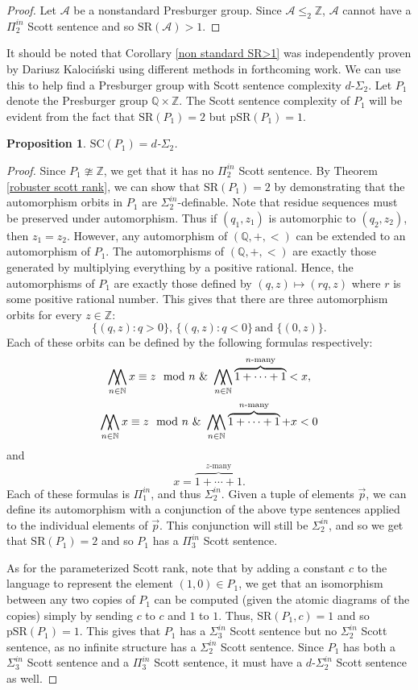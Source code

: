 \documentclass{amsart}%
\numberwithin{theorem}{section}
\newtheorem{proposition}[theorem]{Proposition}
\newcommand{\Q}{\mathbb{Q}}
\newcommand{\Z}{\mathbb{Z}}
\newcommand{\N}{\mathbb{N}}
\newcommand{\A}{\mathcal{A}}
\newcommand{\0}{\emptyset}
\DeclareMathOperator*{\WW}{\bigwedge\mkern-12mu\bigwedge}
\newcommand{\SR}{\text{SR}}
\newcommand{\pSR}{\text{pSR}}
\newcommand{\SC}{\text{SC}}
\begin{document}
\begin{proof}
    Let $\A$ be a nonstandard Presburger group. Since $\A\leq_2\Z$, $\A$ cannot have a $\Pi^{in}_2$ Scott sentence and so $\SR(\A)>1$. 
\end{proof}

It should be noted that Corollary \ref{non standard SR>1} was independently proven by Dariusz Kaloci\'nski using different methods in forthcoming work. We can use this to help find a Presburger group with Scott sentence complexity $d$-$\Sigma_2$. Let $P_1$ denote the Presburger group $\Q\times \Z$. The Scott sentence complexity of $P_1$ will be evident from the fact that $\SR(P_1)=2$ but $\pSR(P_1)=1$. 

\begin{proposition}
\label{P_1 SC}
    $\SC(P_1)=d$-$\Sigma_2$.
\end{proposition}

\begin{proof}
    Since $P_1\ncong\Z$, we get that it has no $\Pi^{in}_2$ Scott sentence. By Theorem \ref{robuster scott rank}, we can show that $\SR(P_1)=2$ by demonstrating that the automorphism orbits in $P_1$ are $\Sigma^{in}_2$-definable. Note that residue sequences must be preserved under automorphism. Thus if $(q_1,z_1)$ is automorphic to $(q_2,z_2)$, then $z_1=z_2$. However, any  automorphism of $(\Q,+,<)$ can be extended to an automorphism of $P_1$. The  automorphisms of $(\Q,+,<)$ are exactly those generated by multiplying everything by a positive rational. Hence, the automorphisms of $P_1$ are exactly those defined by $(q,z)\mapsto (rq,z)$ where $r$ is some positive rational number. This gives that there are three automorphism orbits for every $z \in \Z$: $$\{(q,z):q>0\}, \, \{(q,z):q<0\}\, \text {and } \{(0,z)\}.$$ Each of these orbits can be defined by the following formulas respectively:
    $$\WW_{n\in \N} x \equiv z \mod n \,\, \&\,\, \WW_{n\in \N} \overbrace{1+\cdots + 1}^\text{$n$-many}<x,$$ 
    $$\WW_{n\in \N} x \equiv z \mod n \,\, \&\,\, \WW_{n\in \N} \overbrace{1+\cdots + 1}^\text{$n$-many}+x<0$$ and $$x=\overbrace{1+\cdots + 1}^{z\text{-many}}. $$
    Each of these formulas is $\Pi^{in}_1$, and thus $\Sigma^{in}_2$. Given a tuple of elements $\vec p$, we can define its automorphism with a conjunction of the above type sentences applied to the individual elements of $\vec p$. This conjunction will still be $\Sigma^{in}_2$, and so we get that $\SR(P_1)= 2$ and so $P_1$ has a $\Pi^{in}_3$ Scott sentence. 

    As for the parameterized Scott rank, note that  by adding a constant $c$ to the language to represent the element $(1,0)\in P_1$, we get that an isomorphism between any two copies of $P_1$ can be computed (given the atomic diagrams of the copies) simply by sending $c$ to $c$ and $1$ to $1$. Thus, $\SR(P_1,c)=1$ and so $\pSR(P_1)=1$. This gives that $P_1$ has a $\Sigma^{in}_3$ Scott sentence but no $\Sigma^{in}_2$ Scott sentence, as no infinite structure has a $\Sigma^{in}_2$ Scott sentence. Since $P_1$ has both a $\Sigma^{in}_3$ Scott sentence and a $\Pi^{in}_3$ Scott sentence, it must have a $d$-$\Sigma^{in}_2$ Scott sentence as well. 
\end{proof} 
\end{document}
